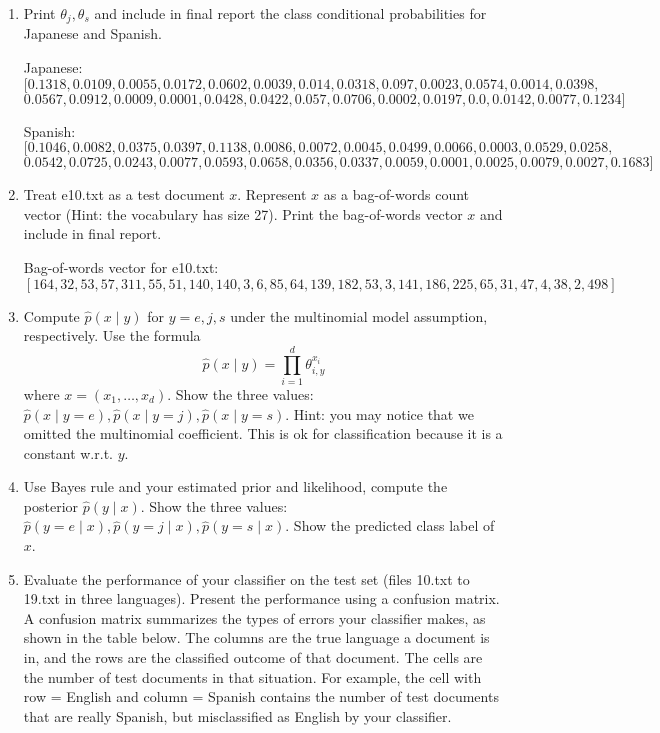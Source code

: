 \documentclass[a4paper]{article}
\theoremstyle{definition}
\newenvironment{soln}{
    \leavevmode\color{blue}\ignorespaces
}{}
\begin{document}
\begin{enumerate}
\item
Print $\theta_j, \theta_s$ and include in final report the class conditional probabilities for Japanese and Spanish.

\begin{soln}

    Japanese:
    $$[0.1318, 0.0109, 0.0055, 0.0172, 0.0602, 0.0039, 0.014, 0.0318, 0.097, 0.0023, 0.0574, 0.0014, 0.0398,$$
    $$0.0567, 0.0912, 0.0009, 0.0001, 0.0428, 0.0422, 0.057, 0.0706, 0.0002, 0.0197, 0.0, 0.0142, 0.0077, 0.1234]$$

    Spanish:
    $$[0.1046, 0.0082, 0.0375, 0.0397, 0.1138, 0.0086, 0.0072, 0.0045, 0.0499, 0.0066, 0.0003, 0.0529, 0.0258,$$
    $$0.0542, 0.0725, 0.0243, 0.0077, 0.0593, 0.0658, 0.0356, 0.0337, 0.0059, 0.0001, 0.0025, 0.0079, 0.0027, 0.1683]$$

\end{soln}


\item
Treat e10.txt as a test document $x$.
Represent $x$ as a bag-of-words count vector (Hint: the vocabulary has size 27).
Print the bag-of-words vector $x$ and include in final report.

\begin{soln}
    Bag-of-words vector for e10.txt: \\
    $$[164, 32, 53, 57, 311, 55, 51, 140, 140, 3, 6, 85, 64, 139, 182, 53, 3, 141, 186, 225, 65, 31, 47, 4, 38, 2, 498]$$
\end{soln}

\item
Compute $\hat p(x \mid y)$ for $y=e, j, s$ under the multinomial model assumption, respectively.
Use the formula
$$\hat p(x \mid y) = \prod_{i=1}^d \theta_{i, y}^{x_i}$$
where $x=(x_1, \ldots, x_d)$.
Show the three values: $\hat p(x \mid y=e), \hat p(x \mid y=j), \hat p(x \mid y=s)$.
Hint: you may notice that we omitted the multinomial coefficient.  This is ok for classification because it is a constant w.r.t. $y$.


\item
Use Bayes rule and your estimated prior and likelihood, compute the posterior $\hat p(y \mid x)$.
Show the three values: $\hat p(y=e \mid x), \hat p(y=j \mid x), \hat p(y=s \mid x)$.
Show the predicted class label of $x$.


\item
Evaluate the performance of your classifier on the test set (files 10.txt to 19.txt in three languages).
Present the performance using a confusion matrix. A confusion matrix summarizes the types of errors your classifier makes, as shown in the table below.   The columns are the true language a document is in, and the rows are the classified outcome of that document.  The cells are the number of test documents in that situation.  For example, the cell with row = English and column = Spanish contains the number of test documents that are really Spanish, but misclassified as English by your classifier.


\end{enumerate}
\end{document}
